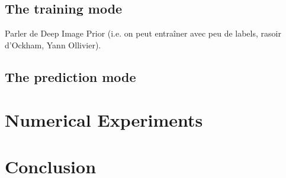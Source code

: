 \documentclass{article}
\begin{document}
\subsection{The training mode}

Parler de Deep Image Prior (i.e. on peut entraîner avec peu de labels, rasoir d'Ockham, Yann Ollivier).

\subsection{The prediction mode}


\section{Numerical Experiments}
\label{sec:experiments}




\section{Conclusion}
\label{sec:conclusion}




\vfill
\pagebreak




\end{document}
